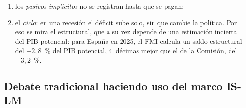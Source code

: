 \documentclass[11pt]{article}
\begin{document}
\begin{itemize}
\begin{enumerate}
  \item los \emph{pasivos implícitos} no se registran hasta que se pagan;
  \item el \emph{ciclo}: en una recesión el déficit sube solo, sin que cambie la política. Por eso se mira el estructural, que a su vez depende de una estimación incierta del PIB potencial: para España en 2025, el FMI calcula un saldo estructural del $-2{,}8$~\% del PIB potencial, 4~décimas mejor que el de la Comisión, del $-3{,}2$~\%\nocite{FMI2026FM,CE2026AMECO}.
  \end{enumerate}
\end{itemize}

\subsection{Debate tradicional haciendo uso del marco IS-LM}\label{sec:islm}
\end{document}
